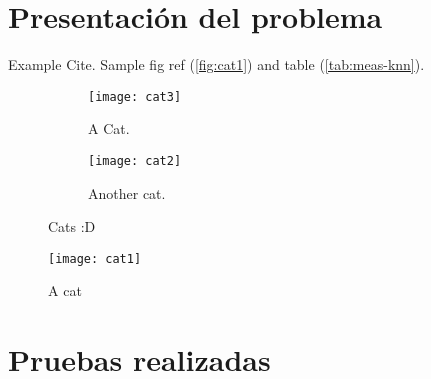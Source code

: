 \documentclass[12pt]{article} %
\begin{document}


\tableofcontents

\listoffigures

\listoftables

\pagebreak


\section{Presentación del problema}

Example Cite\cite{sample-cite}. Sample fig ref (\autoref{fig:cat1}) and table (\autoref{tab:meas-knn}).

\lipsum[1]

\begin{figure}[H]
    \centering
    \begin{subfigure}[t]{0.49\linewidth}
      \centering
      \texttt{[image: cat3]}
      \caption{A Cat.}
      \label{fig:cat1}
    \end{subfigure}
    \hfill
    \begin{subfigure}[t]{0.49\linewidth}
      \centering
      \texttt{[image: cat2]}
      \caption{Another cat.}
      \label{fig:cat2}
    \end{subfigure}
    \vspace{-5pt}
    \caption{Cats :D}
    \vspace{-25pt}
\end{figure}

\lipsum[2-3]

\begin{wrapfigure}{r}{0.4\textwidth}
  \vspace{-10pt}
  \centering
  \texttt{[image: cat1]}
  \caption{A cat}
  \vspace{-20pt}
\end{wrapfigure}

\lipsum[5-7]


\section{Pruebas realizadas}

\lipsum[8-9]
\end{document}
